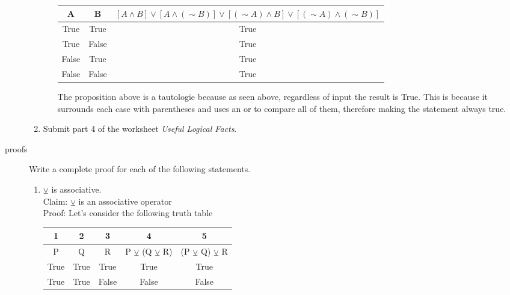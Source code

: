 \documentclass{letter}
\begin{document}
\begin{description}
\begin{enumerate}
\begin{enumerate}
\begin{center}
                                  \begin{tabular}{||c|c|c||}
                                    \hline
                                     A & B &  $[A\wedge B]\vee [A\wedge (\sim B)] \vee [(\sim A)\wedge B] \vee [(\sim A)\wedge (\sim B)]$ \\ \hline
                                    True & True & True \\ \hline
                                    True & False & True \\ \hline
                                    False & True & True \\ \hline
                                    False & False & True \\ \hline
                                    \end{tabular}
                                    \end{center}
The proposition above is a tautologie because as seen above, regardless of input the result is True. This is because it surrounds each case with parentheses and uses an or to compare all of them, therefore making the statement always true.
			\end{enumerate}
	\item Submit part 4 of the worksheet {\em Useful Logical Facts}.
\end{enumerate}
\item[proofs] Write a complete proof for each of the following statements.
	\begin{enumerate}
		\item $\veebar$ is associative. \\
                  Claim: $\veebar$ is an associative operator \\
                  Proof: Let's consider the following truth table \\
                  \begin{center}
                                    \begin{tabular}{||c|c|c|c|c||}
                                      1 & 2 & 3 & 4 & 5 \\
                                    \hline
                                    P & Q & R & P $\veebar$ (Q $\veebar$ R) & (P $\veebar$ Q) $\veebar$ R\\ \hline
                                    True & True & True & True & True\\ \hline
                                    True & True & False & False & False\\ \hline

\end{tabular}
\end{center}
\end{enumerate}
\end{description}
\end{document}
